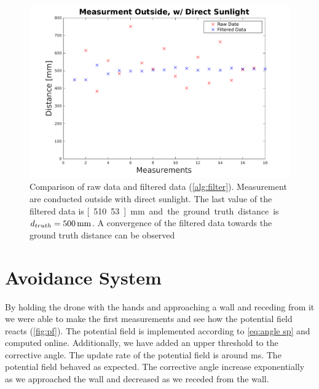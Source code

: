\begin{figure}
	\centering
	\includegraphics[width=0.9\linewidth]{pictures/plot_filter_sun.pdf}
	\caption{Comparison of raw data and filtered data (\cref{alg:filter}). Measurement are conducted outside with direct sunlight. The last value of the filtered data is \unit[510.53]{mm} and the ground truth distance is $d_{truth}=\unit[500]{mm}$. A convergence of the filtered data towards the ground truth distance can be observed}
	\label{fig:meas_out_sun filter}
\end{figure}


\section{Avoidance System}
\label{sec:avoidance}
By holding the drone with the hands and approaching a wall and receding from it we were able to make the first measurements and see how the potential field reacts (\cref{fig:pf}). The potential field is implemented according to \cref{eq:angle sp} and computed online. Additionally, we have added an upper threshold to the corrective angle. The update rate of the potential field is around \unit[200]{ms}. The potential field behaved as expected. The corrective angle increase exponentially as we approached the wall and decreased as we receded from the wall.\\

